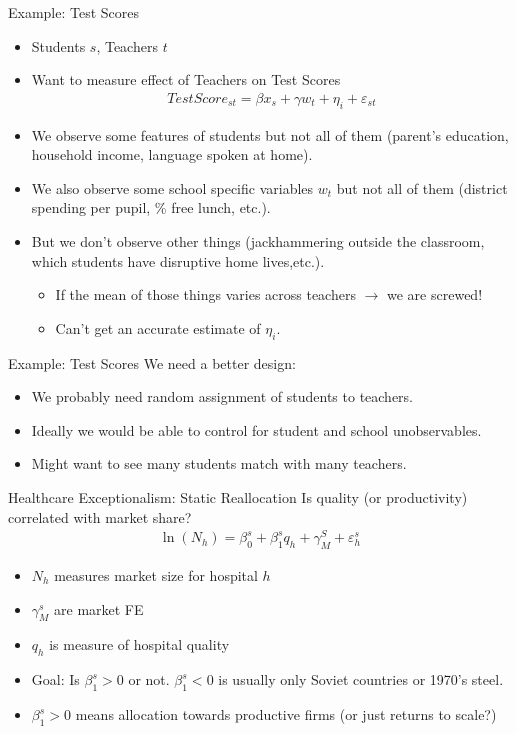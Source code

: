 \documentclass[xcolor=pdftex,dvipsnames,table,mathserif,aspectratio=169]{beamer}
\begin{document}
\begin{frame}{Example: Test Scores}
\begin{itemize}
\item Students $s$, Teachers $t$
\item Want to measure effect of \alert{Teachers} on \alert{Test Scores}
\begin{eqnarray*}
TestScore_{st} = \beta x_s +\gamma w_t+  \eta_{i} + \varepsilon_{st}
\end{eqnarray*}
\item We observe some features of students but not all of them (parent's education, household income, language spoken at home).
\item We also observe some school specific variables $w_t$ but not all of them (district spending per pupil, \% free lunch, etc.).
\item But we don't observe other things (jackhammering outside the classroom, which students have disruptive home lives,etc.).
\begin{itemize}
\item If the mean of those things varies across teachers $\rightarrow$ we are screwed!
\item Can't get an accurate estimate of $\eta_i$.
\end{itemize}
\end{itemize}
\end{frame}


\begin{frame}{Example: Test Scores}
We need a better design:
\begin{itemize}
\item We probably need random assignment of students to teachers.
\item Ideally we would be able to control for student and school unobservables.
\item Might want to see many students match with many teachers.
\end{itemize}
\end{frame}

\begin{frame}{Healthcare Exceptionalism: Static Reallocation}
Is \alert{quality} (or productivity) correlated with \alert{market share}?
\begin{align*}
\ln \left(N_{h}\right)=\beta_{0}^{s}+\beta_{1}^{s} q_{h}+\gamma_{M}^{S}+\varepsilon_{h}^{s}
\end{align*}
\begin{itemize}
\item $N_h$ measures market size for hospital $h$
\item $\gamma_M^s$ are market FE
\item $q_h$ is measure of hospital quality
\item Goal: Is $\beta_1^s>0$ or not. $\beta_1^s<0$ is usually only Soviet countries or 1970's steel.
\item $\beta_1^s>0$ means allocation towards productive firms (or just returns to scale?)
\end{itemize}
\end{frame}
\end{document}
